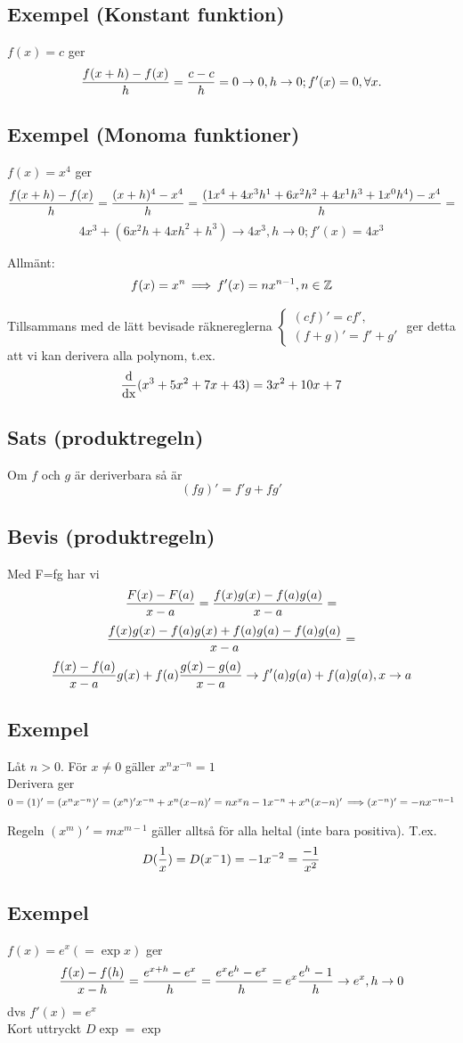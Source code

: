 \documentclass{article}
\begin{document}
\subsection{Exempel (Konstant funktion)}
$ f(x) = c $ ger
$$ \frac{f(x+h)-f(x)}{h} = \frac{c-c}{h} = 0 \to 0, h \to 0; f'(x) = 0, \forall x. $$

\subsection{Exempel (Monoma funktioner)}
$ f(x) = x^4 $ ger 
$$ \frac{f(x+h)-f(x)}{h} = \frac{(x+h)^4 - x^4}{h} = \frac{(1x^4 + 4x^3h^1 + 6x^2h^2+4x^1h^3+1x^0h^4)-x^4}{h} =$$
$$4x^3+(6x^2h + 4xh^2+h^3) \to 4x^3, h\to 0; f'(x) = 4x^3$$

Allmänt:
$$ f(x) = x^n \operatorname{\implies} f'(x) = nx^{n-1}, n\in{\mathbb Z}$$

Tillsammans med de lätt bevisade räknereglerna
$
\begin{cases}
(cf)' = cf',\\
(f+g)' = f' + g'
\end{cases}
$
ger detta att vi kan derivera alla polynom, t.ex.
$$ \operatorname{\frac{d}{dx}} (x^3+5x^2+7x+43) = 3x^2+10x+7 $$

\subsection{Sats (produktregeln)}
Om $f$ och $g$ är deriverbara så är
$$ (fg)' = f'g + fg' $$

\subsection{Bevis (produktregeln)}
Med F=fg har vi
$$ \frac{F(x)-F(a)}{x-a} = \frac{f(x)g(x) - f(a)g(a)}{x-a} = $$
$$ \frac{f(x)g(x) - f(a)g(x) + f(a)g(a) - f(a)g(a)}{x-a}  = $$
$$ \frac{f(x)-f(a)}{x-a}g(x) + f(a)\frac{g(x)-g(a)}{x-a} \to f'(a)g(a)+f(a)g(a), x\to a $$

\subsection{Exempel}
Låt $n>0$. För $x\neq 0$ gäller $x^nx^{-n}=1$\\
Derivera ger
$0 = (1)' = (x^nx^{-n})' = (x^n)'x^{-n} + x^n(x{-n})'
= nx^x{n-1}x^{-n} + x^n(x{-n})' \operatorname{\implies} (x^{-n})' = -nx^{-n-1}$

Regeln $(x^m)' = mx^{m-1}$ gäller alltså för alla heltal (inte bara positiva).
T.ex. $$D(\frac{1}{x}) = D(x^-1) = -1x^{-2} = \frac{-1}{x^2}$$

\subsection{Exempel}
$ f(x)=e^x (= \exp x) $ ger
$$ \frac{f(x)-f(h)}{x-h} = \frac{e^{x+h} - e^x}{h} = \frac{e^xe^h - e^x}{h} = e^x\frac{e^h-1}{h} \to e^x, h\to 0 $$
dvs $f'(x) = e^x$\\
Kort uttryckt $D\exp = \exp$
\end{document}
